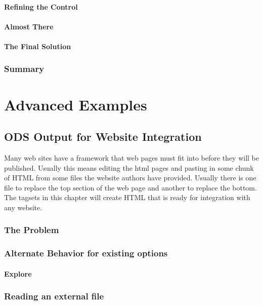 \documentclass{book}
\begin{document}
\subsection{Refining the Control}

\subsection{Almost There}

\subsection{The Final Solution}

\section{Summary}

\part{Advanced Examples}
\chapter{ODS Output for Website Integration}
Many web sites have a framework that web pages must fit into 
before they will be published.  Usually this means
editing the html pages and pasting in some chunk of HTML from
some files the website authors have provided.
Usually there is one file to replace the top section of the
web page and another to replace the bottom.  
The tagsets in this chapter will create HTML that
is ready for integration with any website.  
\section{The Problem}

\section{Alternate Behavior for existing options}

\subsection{Explore}

\section{Reading an external file}
\end{document}
